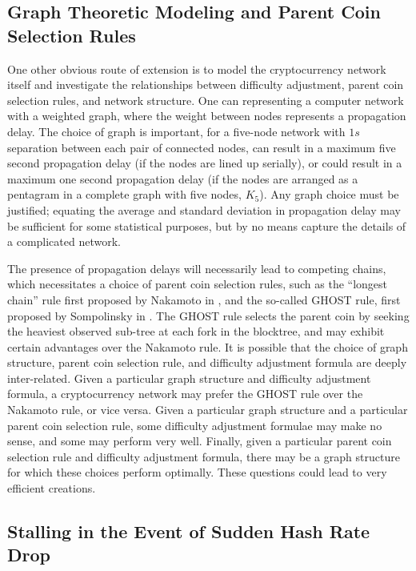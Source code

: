 \documentclass[12pt,english]{mrl}
\theoremstyle{definition}
\numberwithin{equation}{section}
\numberwithin{figure}{section}
\numberwithin{equation}{section}
\numberwithin{equation}{section}
\numberwithin{figure}{section}
\begin{document}
\subsection{Graph Theoretic Modeling and Parent Coin Selection Rules}
One other obvious route of extension is to model the cryptocurrency network itself and investigate the relationships between difficulty adjustment, parent coin selection rules, and network structure. One can representing a computer network with a weighted graph, where the weight between nodes represents a propagation delay. The choice of graph is important, for a five-node network with $1 s$ separation between each pair of connected nodes, can result in a maximum five second propagation delay (if the nodes are lined up serially), or could result in a maximum one second propagation delay (if the nodes are arranged as a pentagram in a complete graph with five nodes, $K_5$). Any graph choice must be justified; equating the average and standard deviation in propagation delay may be sufficient for some statistical purposes, but by no means capture the details of a complicated network.

The presence of propagation delays will necessarily lead to competing chains, which necessitates a choice of parent coin selection rules, such as the ``longest chain'' rule first proposed by Nakamoto in \cite{nakamoto2008bitcoin}, and the so-called GHOST rule, first proposed by Sompolinsky in \cite{sompolinsky2013accelerating}. The GHOST rule selects the parent coin by seeking the heaviest observed sub-tree at each fork in the blocktree, and may exhibit certain advantages over the Nakamoto rule. It is possible that the choice of graph structure, parent coin selection rule, and difficulty adjustment formula are deeply inter-related. Given a particular graph structure and difficulty adjustment formula, a cryptocurrency network may prefer the GHOST rule over the Nakamoto rule, or vice versa. Given a particular graph structure and a particular parent coin selection rule, some difficulty adjustment formulae may make no sense, and some may perform very well. Finally, given a particular parent coin selection rule and difficulty adjustment formula, there may be a graph structure for which these choices perform optimally. These questions could lead to very efficient creations.

\subsection{Stalling in the Event of Sudden Hash Rate Drop}
\end{document}
